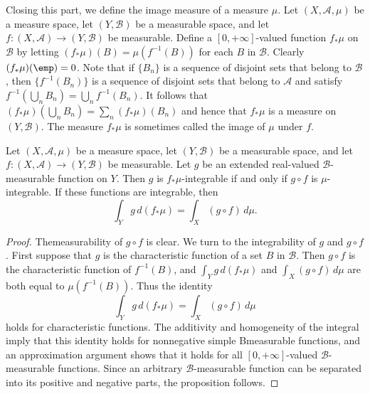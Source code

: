 Closing this part, we define the image measure of a measure $\mu$. Let $(X,\mathcal{A},\mu)$ be a measure space, let $(Y,\mathcal{B})$ be a measurable space, and let $f:(X,\mathcal{A})\to(Y,\mathcal{B})$ be measurable. Define a $[0,+\infty]$-valued function $f_*\mu$ on $\mathcal{B}$ by letting $(f_*\mu)(B)=\mu(f^{-1}(B))$ for each $B$ in $\mathcal{B}$. Clearly $(f_*\mu)(\emp)=0$. Note that if $\{B_n\}$ is a sequence of disjoint sets that belong to $\mathcal{B}$, then $\{f^{-1}(B_n)\}$ is a
sequence of disjoint sets that belong to $\mathcal{A}$ and satisfy $f^{-1}(\bigcup_nB_n)=\bigcup_nf^{-1}(B_n)$. It follows that $(f_*\mu)(\bigcup_nB_n)=\sum_n(f_*\mu)(B_n)$ and hence that $f_*\mu$ is a measure on $(Y,\mathcal{B})$. The measure $f_*\mu$ is sometimes called the image of $\mu$ under $f$.
\begin{proposition}\label{measure push out by measurable function prop}
Let $(X,\mathcal{A},\mu)$ be a measure space, let $(Y,\mathcal{B})$ be a measurable space, and let $f:(X,\mathcal{A})\to(Y,\mathcal{B})$ be measurable. Let $g$ be an extended real-valued $\mathcal{B}$-measurable function on $Y$. Then $g$ is $f_*\mu$-integrable if and only if $g\circ f$ is $\mu$-integrable. If these functions are integrable, then
\[\int_Yg\,d(f_*\mu)=\int_X(g\circ f)\,d\mu.\]
\end{proposition}
\begin{proof}
Themeasurability of $g\circ f$ is clear. We turn to the integrability of $g$ and $g\circ f$. First suppose that $g$ is the characteristic function of a set $B$ in $\mathcal{B}$. Then $g\circ f$ is the characteristic function of $f^{-1}(B)$, and $\int_Yg\,d(f_*\mu)$ and $\int_X(g\circ f)\,d\mu$ are both equal to $\mu(f^{-1}(B))$. Thus the identity 
\[\int_Yg\,d(f_*\mu)=\int_X(g\circ f)\,d\mu\]
holds for characteristic functions. The additivity and homogeneity of the integral imply that this identity holds for nonnegative simple Bmeasurable
functions, and an approximation argument shows that it holds for all $[0,+\infty]$-valued $\mathcal{B}$-measurable functions. Since an arbitrary $\mathcal{B}$-measurable function can be separated into its positive and negative parts, the proposition follows.
\end{proof}
